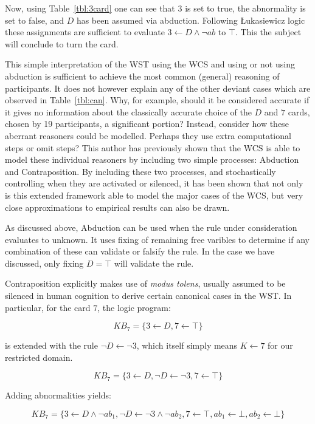 \documentclass{article}
\begin{document}
Now, using Table~\ref{tbl:3card} one can see that $3$ is set to true, the abnormality is set to false, and $D$ has been assumed via abduction. Following \L ukasiewicz logic these assignments are sufficient to evaluate $3\leftarrow D \land \lnot ab$ to $\top$. This the subject will conclude to turn the card.

This simple interpretation of the WST using the WCS and using or not using abduction is sufficient to achieve the most common (general) reasoning of participants. It does not however explain any of the other deviant cases which are observed in Table~\ref{tbl:can}. Why, for example, should it be considered accurate if it gives no information about the classically accurate choice of the $D$ and $7$ cards, chosen by 19 participants, a significant portion? Instead, consider how these aberrant reasoners could be modelled. Perhaps they use extra computational steps or omit steps? This author has previously shown that the WCS is able to model these individual reasoners \citep{breu2019weak} by including two simple processes: Abduction and Contraposition. By including these two processes, and stochastically controlling when they are activated or silenced, it has been shown that not only is this extended framework able to model the major cases of the WCS, but very close approximations to empirical results can also be drawn.

As discussed above, Abduction can be used when the rule under consideration evaluates to unknown. It uses fixing of remaining free varibles to determine if any combination of these can validate or falsify the rule. In the case we have discussed, only fixing $D = \top$ will validate the rule.

Contraposition explicitly makes use of \textit{modus tolens}, usually assumed to be silenced in human cognition to derive certain canonical cases in the WST. In particular, for the card $7$, the logic program:

\[
KB_7 = \{3 \leftarrow D, 7 \leftarrow \top \}
\]

is extended with the rule $\lnot D \leftarrow \lnot 3$, which itself simply means $K \leftarrow 7$ for our restricted domain. 

\[
KB_7 = \{3 \leftarrow D, \lnot D \leftarrow \lnot 3, 7 \leftarrow \top \}
\]

Adding abnormalities yields:

\[
KB_7 = \{3 \leftarrow D \land \lnot ab_1, \lnot D \leftarrow \lnot 3 \land \lnot ab_2, 7 \leftarrow \top, ab_1 \leftarrow \bot, ab_2 \leftarrow \bot \}
\]
\end{document}
